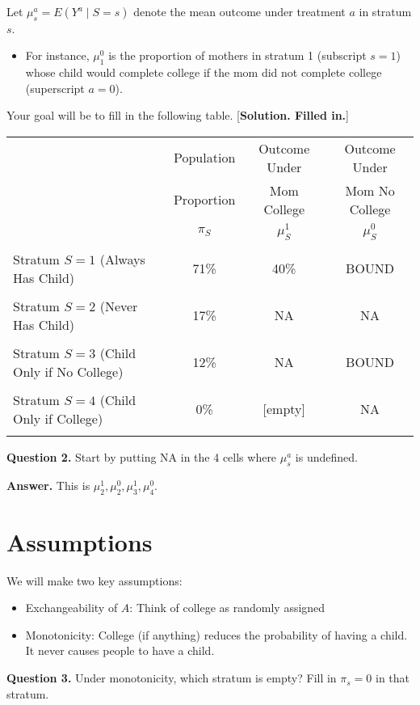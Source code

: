 \documentclass[10pt]{article}
\begin{document}
Let $\mu^a_s = E(Y^a\mid S = s)$ denote the mean outcome under treatment $a$ in stratum $s$.
\begin{itemize}
    \item For instance, $\mu^0_1$ is the proportion of mothers in stratum 1 (subscript $s = 1$) whose child would complete college if the mom did not complete college (superscript $a = 0$).
\end{itemize}

Your goal will be to fill in the following table. [\textbf{Solution. Filled in.}]

\begin{tabular}{lccc}
\hline
 & Population & Outcome Under & Outcome Under \\
 & Proportion & Mom College & Mom No College \\
 & $\pi_S$ & $\mu^1_S$ & $\mu^0_S$ \\
 \hline
 \\
 Stratum $S = 1$ (Always Has Child) 
    & 71\% & 40\% & BOUND \\
 \\
 Stratum $S = 2$ (Never Has Child)
    & 17\% & NA & NA \\
 \\
 Stratum $S = 3$ (Child Only if No College) 
    & 12\% & NA & BOUND \\
 \\
 Stratum $S = 4$ (Child Only if College) 
    & 0\% & [empty] & NA \\
 \\
 \hline
\end{tabular}

\textbf{Question 2.} Start by putting NA in the 4 cells where $\mu^a_s$ is undefined.

\textbf{Answer.} This is $\mu^1_2,\mu^0_2,\mu^1_3,\mu^0_4$.

\section*{Assumptions}

We will make two key assumptions:
\begin{itemize}
\item Exchangeability of $A$: Think of college as randomly assigned
\item Monotonicity: College (if anything) reduces the probability of having a child. It never causes people to have a child.
\end{itemize}

\textbf{Question 3.} Under monotonicity, which stratum is empty? Fill in $\pi_s = 0$ in that stratum.
\end{document}

